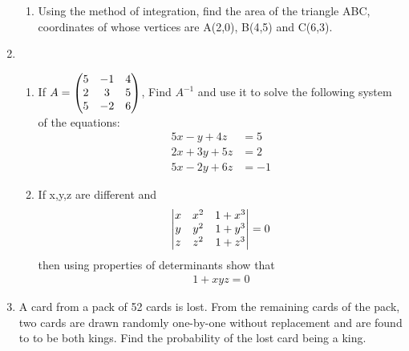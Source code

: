 \documentclass[journal,12pt,twocolumn]{IEEEtran}
\renewcommand\thesection{\arabic{section}}
\begin{document}
\begin{enumerate}[label=\thesection.\arabic*.,ref=\thesection.\theenumi]
\begin{enumerate}
\item Using the method of integration, find the area of the triangle ABC, coordinates of whose vertices are A(2,0), B(4,5) and C(6,3).\\
 \end{enumerate}
\item \begin{enumerate} \item If $A=\begin{pmatrix}5 & -1 & 4 \\ 2 & 3 & 5 \\ 5 & -2 & 6\end{pmatrix} $, Find $A^{-1}$ and use it to solve the following system of the equations: \\
\begin{align}
	5x-y+4z &= 5 \nonumber \\
	2x+3y+5z &= 2 \nonumber \\
	5x-2y+6z &= -1 
\nonumber
\end{align}
    
\item If x,y,z are different and \begin{align} \begin{vmatrix}x & x^2 & 1+x^3 \\ y & y^2 & 1+y^3 \\ z & z^2 & 1+z^3\end{vmatrix}=0 \nonumber \end{align} then using properties of determinants show that \begin{align} 1+xyz=0 \nonumber \end{align}
\end{enumerate} 

\item A card from a pack of 52 cards is lost. From the remaining cards of the pack, two cards are drawn randomly one-by-one without replacement and are found to to be both kings. Find the probability of the lost card being a king.\\

\end{enumerate}
\end{document}
